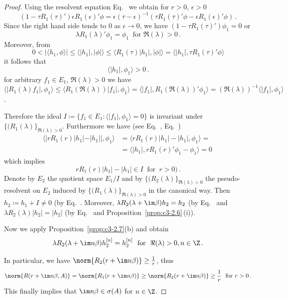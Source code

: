 \begin{proof}
Using the resolvent equation Eq.~ we obtain for $r > 0$, $\epsilon > 0$
\[
(1 - \tau R_{1}(\tau)')\epsilon R_{1}(\epsilon)'\phi = \epsilon(\tau-\epsilon)^{-1}(\tau R_{1}(\tau)'\phi - \epsilon R_{1}(\epsilon)'\phi)\,.
\]
Since the right hand side tends to $0$ as $\epsilon \to 0$, we have $(1 - \tau R_{1}(\tau)')\phi_{1} = 0$ or
\begin{equation}\label{eq:c3-2.18}
\lambda R_{1}(\lambda)'\phi_{1} = \phi_{1} \ \text{ for } \Re(\lambda) > 0\,.
\end{equation} 
Moreover, from 
\[
0 < |\langle h_{1},\phi \rangle| \leq \langle |h_{1}|,|\phi| \rangle \leq \langle R_{1}(\tau)|h_{1}|,|\phi| \rangle = \langle |h_{1}|,\tau R_{1}(\tau)'\phi \rangle 
\]
it follows that
\begin{equation}\label{eq:c3-2.19}
		\langle |h_{1}|,\phi_{1} \rangle > 0\,.
\end{equation}
for arbitrary $f_{1} \in E_{1}$, $\Re(\lambda) > 0$ we have $\langle |R_{1}(\lambda)f_{1}|,\phi_{1} \rangle \leq \langle R_{1}(\Re(\lambda))|f_{1}|,\phi_{1} \rangle = \langle |f_{1}|,R_{1}(\Re(\lambda))'\phi_{1} \rangle = (\Re(\lambda))^{-1}\langle |f_{1}|,\phi_{1} \rangle$.

Therefore the ideal $I \coloneqq \{f_{1} \in E_{1} \colon \langle |f_{1}|,\phi_{1} \rangle = 0\}$ is invariant under $\{(R_{1}(\lambda)\}_{\Re(\lambda)>0}$.
Furthermore we have (see Eq.~, Eq.~) 
\begin{align*}
	\langle |rR_{1}(r)|h_{1}| - |h_{1}||,\phi_{1} \rangle &= \langle rR_{1}(r)|h_{1}| - |h_{1}|,\phi_{1} \rangle = \\
	& = \langle |h_{1}|,rR_{1}(r)'\phi_{1} - \phi_{1} \rangle = 0\ 
\end{align*}	
which implies
\begin{equation}\label{eq:c3-2.20}
rR_{1}(r)|h_{1}| - |h_{1}| \in I \ \text{ for } \ r > 0)\,.
\end{equation}
Denote by $E_{2}$ the quotient space $E_{1}/I$ and by $\{(R_{2}(\lambda)\}_{\Re(\lambda)>0}$ the pseudo-resolvent on $E_{2}$ induced by $\{(R_{1}(\lambda)\}_{\Re(\lambda)>0}$ in the canonical way. 
Then $h_{2} \coloneqq h_{1} + I \neq 0$ (by Eq.~\myeqpageref{eq:c3-2.19}.
Moreover, $\lambda R_{2}(\lambda+\im\beta)h_{2} = h_{2}$ (by Eq.~ and $\lambda R_{2}(\lambda)|h_{2}| = |h_{2}|$ (by Eq.~ and Proposition~\ref{prop:c3-2.6}\,(i)).

Now we apply Proposition~\ref{prop:c3-2.7}(b) and obtain
\begin{equation}\label{eq:c3-2.21}
	\lambda R_{2}(\lambda+\im n\beta)h_{2}^{[n]} = h_{2}^{[n]}\ \text{ for } \ \Re(\lambda) > 0 , n \in \Z\,.
\end{equation}

In particular, we have $\norm{R_{2}(r+\im n\beta)} \geq \frac{1}{r}$, thus 
\[
\norm{R(r+\im n\beta,A)} = \norm{R_{1}(r+\im n\beta)} \geq \norm{R_{2}(r+\im n\beta)} \geq \frac{1}{r} \ \text{ for } r > 0\,.
\]
This finally implies that $ \im n\beta \in \sigma(A)$ for $n \in \Z$.
\end{proof}
